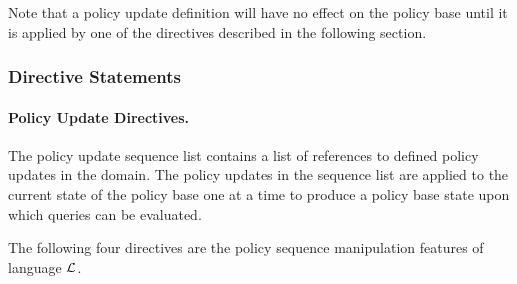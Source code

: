 \documentclass[global,twocolumn,final]{svjour}
\begin{document}
          Note that a policy update definition will have no effect on the
          policy base until it is applied by one of the directives described in
          the following section.

        \subsubsection{Directive Statements}

        \paragraph{Policy Update Directives.}

        The policy update sequence list contains a list of references to
        defined policy updates in the domain. The policy updates in the
        sequence list are applied to the current state of the policy base one
        at a time to produce a policy base state upon which queries can be
        evaluated.

        The following four directives are the policy sequence manipulation
        features of language $\cal{L}$.
\end{document}
